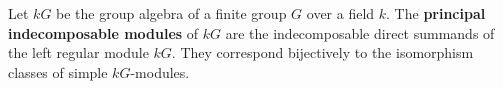 \begin{definition}
\label{def:principal-indecomposable-module}
Let $kG$ be the group algebra of a finite group $G$ over a field $k$. The \textbf{principal indecomposable modules} of $kG$ are the indecomposable direct summands of the left regular module $kG$. They correspond bijectively to the isomorphism classes of simple $kG$-modules.
\end{definition}
